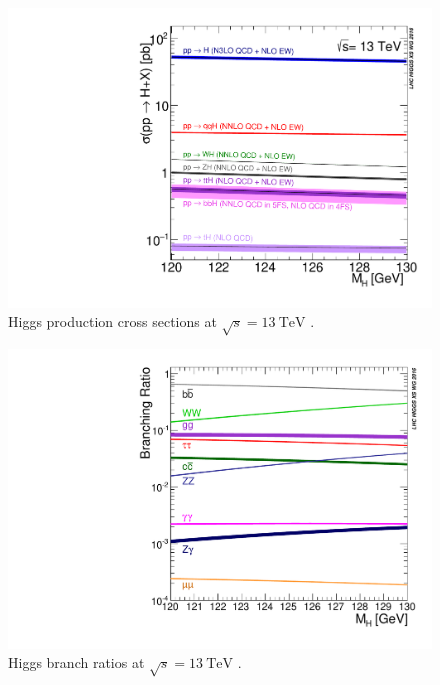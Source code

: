 \begin{figure}[!htbp]
  \centering
  \includegraphics[width=0.5\linewidth]{chapters/1.theory/figs/plot_13tev_H_sqrt.pdf}
  \caption{Higgs production cross sections at $\sqrt{s} = \SI{13}{\TeV}$ \cite{deFlorian:2016spz}.}
  \label{fig:higgs_production_xs}
\end{figure}

\begin{figure}[!htbp]
  \centering
  \includegraphics[width=0.5\linewidth]{chapters/1.theory/figs/SMHiggsBR.YR4-square.pdf}
  \caption{Higgs branch ratios at $\sqrt{s} = \SI{13}{\TeV}$ \cite{deFlorian:2016spz}.}
  \label{fig:higgs_br}
\end{figure}
